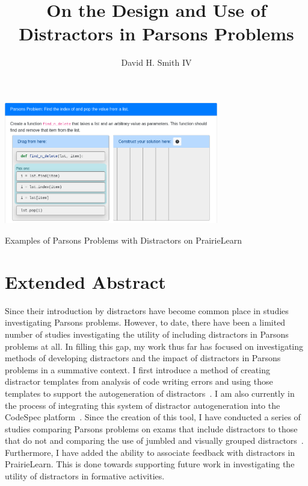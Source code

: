 \documentclass[authorversion,nonacm]{acmart}
\begin{document}


\title{On the Design and Use of Distractors in Parsons Problems}

\author{David H. Smith IV}


\begin{teaserfigure}
    \centering
    \includegraphics[width=0.70\textwidth]{imgs/parsons.png}
    \caption{Examples of Parsons Problems with Distractors on PrairieLearn}
\end{teaserfigure}

\maketitle

\section{Extended Abstract}

Since their introduction by \citet{parsons2006parson} distractors have become
common place in studies investigating Parsons problems. However, to date, there
have been a limited number of studies investigating the utility of including
distractors in Parsons problems at all.  In filling this gap, my work thus far
has focused on investigating methods of developing distractors and the impact
of distractors in Parsons problems in a summative context. I first introduce a
method of creating distractor templates from analysis of code writing errors
and using those templates to support the autogeneration of distractors~\cite{}.
I am also currently in the process of integrating this system of distractor
autogeneration into the CodeSpec platform~\cite{}. Since the creation of this
tool, I have conducted a series of studies comparing Parsons problems on exams
that include distractors to those that do not and comparing the use of jumbled
and visually grouped distractors~\cite{}. Furthermore, I have added the ability
to associate feedback with distractors in PrairieLearn. This is done towards
supporting future work in investigating the utility of distractors in formative
activities.
\end{document}

